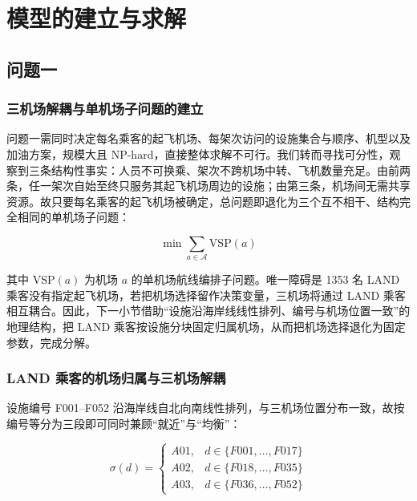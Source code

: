 \documentclass[UTF8,zihao=-4]{ctexart}
\numberwithin{figure}{section}
\numberwithin{table}{section}
\begin{document}
\section{模型的建立与求解}

\subsection{问题一}

\subsubsection{三机场解耦与单机场子问题的建立}

问题一需同时决定每名乘客的起飞机场、每架次访问的设施集合与顺序、机型以及加油方案，规模大且 NP-hard，直接整体求解不可行。我们转而寻找可分性，观察到三条结构性事实：人员不可换乘、架次不跨机场中转、飞机数量充足。由前两条，任一架次自始至终只服务其起飞机场周边的设施；由第三条，机场间无需共享资源。故只要每名乘客的起飞机场被确定，总问题即退化为三个互不相干、结构完全相同的单机场子问题：

\begin{equation}
  \min \sum_{a\in\mathcal{A}} \mathrm{VSP}(a)
\end{equation}

其中 $\mathrm{VSP}(a)$ 为机场 $a$ 的单机场航线编排子问题。唯一障碍是 1353 名 LAND 乘客没有指定起飞机场，若把机场选择留作决策变量，三机场将通过 LAND 乘客相互耦合。因此，下一小节借助“设施沿海岸线线性排列、编号与机场位置一致”的地理结构，把 LAND 乘客按设施分块固定归属机场，从而把机场选择退化为固定参数，完成分解。

\subsubsection{LAND 乘客的机场归属与三机场解耦}

设施编号 F001--F052 沿海岸线自北向南线性排列，与三机场位置分布一致，故按编号等分为三段即可同时兼顾“就近”与“均衡”：

\begin{equation}
  \sigma(d)=\begin{cases}
    A01, & d\in\{F001,\dots,F017\}\\
    A02, & d\in\{F018,\dots,F035\}\\
    A03, & d\in\{F036,\dots,F052\}
  \end{cases}
\end{equation}
\end{document}
